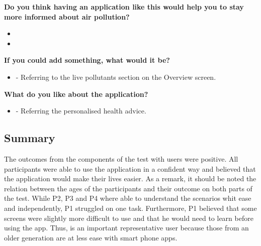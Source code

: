 \bigskip
\textbf{Do you think having an application like this would help you to stay more informed about air pollution?}
\bigskip

\begin{itemize}
	\item {}
    \item {}
\end{itemize}

\bigskip
\textbf{If you could add something, what would it be?}
\bigskip

\begin{itemize}
	\item {} - Referring to the live pollutants section on the Overview screen. 
\end{itemize}

\bigskip
\textbf{What do you like about the application?}
\bigskip

\begin{itemize}
	\item {} - Referring the personalised health advice.
\end{itemize}

\subsection{Summary}
The outcomes from the components of the test with users were positive. All participants were able to use the application in a confident way and believed that the application would make their lives easier. As a remark, it should be noted the relation between the ages of the participants and their outcome on both parts of the test. While P2, P3 and P4 where able to understand the scenarios whit ease and independently, P1 struggled on one task. Furthermore, P1 believed that some screens were slightly more difficult to use and that he would need to learn before using the app. Thus, is an important representative user because those from an older generation are at less ease with smart phone apps.